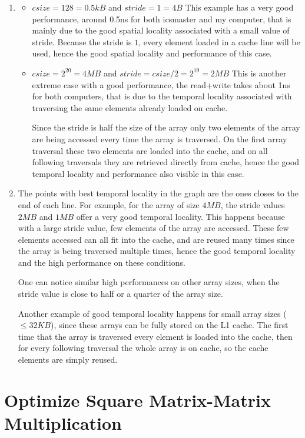 \documentclass[unicode,11pt,a4paper,oneside,numbers=endperiod,openany]{scrartcl}
\begin{document}
\begin{enumerate}
        \item 
            \begin{itemize}
                \item $csize = 128 = 0.5kB$ and $stride = 1 = 4B$
                    This example has a very good performance, around 0.5ns for both icsmaster and my computer, that is mainly due to the good spatial locality associated with a small value of stride.
                    Because the stride is $1$, every element loaded in a cache line will be used, hence the good spatial locality and performance of this case.

                \item $csize = 2^{20} = 4MB$ and $stride = csize/2 = 2^{19} = 2MB$
                    This is another extreme case with a good performance, the read+write takes about 1ns for both computers, that is due to the temporal locality associated with traversing the same elements already loaded on cache.
                    
                    Since the stride is half the size of the array only two elements of the array are being accessed every time the array is traversed.
                    On the first array traversal these two elements are loaded into the cache, and on all following traversals they are retrieved directly from cache, hence the good temporal locality and performance also visible in this case.
            \end{itemize}

        \item  The points with best temporal locality in the graph are the ones closes to the end of each line.
            For example, for the array of size $4MB$, the stride values $2MB$ and $1MB$ offer a very good temporal locality.
            This happens because with a large stride value, few elements of the array are accessed. 
            These few elements accessed can all fit into the cache, and are reused many times since the array is being traversed multiple times, hence the good temporal locality and the high performance on these conditions.

            One can notice similar high performances on other array sizes, when the stride value is close to half or a quarter of the array size.

            Another example of good temporal locality happens for small array sizes ($\leq 32KB$), since these arrays can be fully stored on the L1 cache.
            The first time that the array is traversed every element is loaded into the cache, then for every following traversal the whole array is on cache, so the cache elements are simply reused.

    \end{enumerate}

    \section{Optimize Square Matrix-Matrix Multiplication  }
\end{document}
